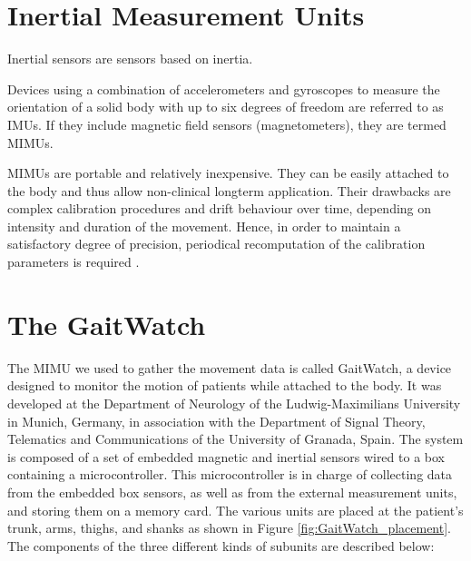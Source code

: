 \section{Inertial Measurement Units}

Inertial sensors are sensors based on inertia.

Devices using a combination of accelerometers and gyroscopes to measure the orientation of a solid body with up to six degrees of freedom are referred to as \glspl{IMU}. If they include magnetic field sensors (magnetometers), they are termed \glspl{MIMU}.

\glspl{MIMU} are portable and relatively inexpensive. They can be easily attached to the body and thus allow non-clinical longterm application. Their drawbacks are complex calibration procedures and drift behaviour over time, depending on intensity and duration of the movement. Hence, in order to maintain a satisfactory degree of precision, periodical recomputation of the calibration parameters is required \cite{olivares_vicente_signal_2013}.

\section{The GaitWatch}

The \gls{MIMU} we used to gather the movement data is called GaitWatch, a device designed to monitor the motion of patients while attached to the body. It was developed at the Department of Neurology of the Ludwig-Maximilians University in Munich, Germany, in association with the Department of Signal Theory, Telematics and Communications of the University of Granada, Spain. The system is composed of a set of embedded magnetic and inertial sensors wired to a box containing a microcontroller. This microcontroller is in charge of collecting data from the embedded box sensors, as well as from the external measurement units, and storing them on a memory card. The various units are placed at the patient's trunk, arms, thighs, and shanks as shown in Figure \ref{fig:GaitWatch_placement}. The components of the three different kinds of subunits are described below:


